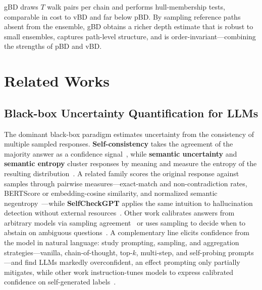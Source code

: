 \documentclass[letterpaper]{article} %
\begin{document}
gBD draws $T$ walk pairs per chain and performs hull-membership tests, comparable
in cost to vBD and far below pBD. By sampling reference paths absent from the
ensemble, gBD obtains a richer depth estimate that is robust to small ensembles,
captures path-level structure, and is order-invariant---combining the strengths
of pBD and vBD.

\section{Related Works}
\label{sec:related}

\subsection{Black-box Uncertainty Quantification for LLMs}
The dominant black-box paradigm estimates uncertainty from the consistency of
multiple sampled responses. \textbf{Self-consistency} takes the agreement of the majority
answer as a confidence signal~\citep{wang2023selfconsistency}, while \textbf{semantic
uncertainty} and \textbf{semantic entropy} cluster responses by meaning and measure the
entropy of the resulting distribution~\citep{kuhn2023semantic, farquhar2024detecting}.
A related family scores the original response against samples through pairwise
measures---exact-match and non-contradiction rates, BERTScore or embedding-cosine
similarity, and normalized semantic negentropy~\citep{lin2023generating}---while
\textbf{SelfCheckGPT} applies the same intuition to hallucination detection without
external resources~\citep{manakul2023selfcheckgpt}. Other work calibrates answers
from arbitrary models via sampling agreement~\citep{chen2024quantifying} or uses
sampling to decide when to abstain on ambiguous
questions~\citep{stelmakh2022selectively}. A complementary line elicits confidence
from the model in natural language: \citet{xiong2024llms} study prompting,
sampling, and aggregation strategies---vanilla, chain-of-thought, top-$k$,
multi-step, and self-probing prompts---and find LLMs markedly overconfident, an
effect prompting only partially mitigates, while other work instruction-tunes
models to express calibrated confidence on self-generated
labels~\citep{liu2024uait}.
\end{document}
